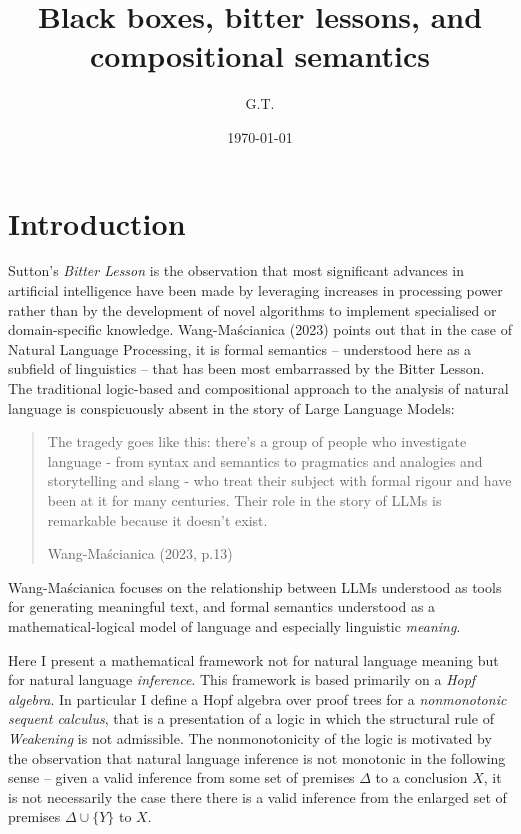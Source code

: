 \documentclass[a4paper,11pt]{report}
\title{Black boxes, bitter lessons, and compositional semantics}
\author{G.T.}
\date{\today}
\begin{document}
\maketitle

\section{Introduction}
Sutton's \emph{Bitter Lesson} is the observation that most significant advances in artificial intelligence have been made by leveraging increases in processing power rather than by the development of novel algorithms to implement specialised or domain-specific knowledge. Wang-Ma\'{s}cianica (2023) points out that in the case of Natural Language Processing, it is formal semantics -- understood here as a subfield of linguistics -- that has been most embarrassed by the Bitter Lesson. The traditional logic-based and compositional approach to the analysis of natural language is conspicuously absent in the story of Large Language Models:

\begin{quote} The tragedy goes like this:
there's a group of people who investigate language - from syntax and semantics to pragmatics and analogies and storytelling and slang - who treat their subject with formal rigour and have been at it for many centuries. Their role in the story of LLMs is remarkable because it doesn't exist. 
\begin{flushright} Wang-Ma\'{s}cianica (2023, p.13)\end{flushright}
\end{quote}

\noindent Wang-Ma\'{s}cianica focuses on the relationship between LLMs understood as tools for generating meaningful text, and formal semantics understood as a mathematical-logical model of language and especially linguistic \emph{meaning}. 

Here I present a mathematical framework not for natural language meaning but for natural language \emph{inference}. This framework is based primarily on a \emph{Hopf algebra}. In particular I define a Hopf algebra over proof trees for a \emph{nonmonotonic sequent calculus}, that is a presentation of a logic in which the structural rule of \emph{Weakening} is not admissible. The nonmonotonicity of the logic is motivated by the observation that natural language inference is not monotonic in the following sense -- given a valid inference from some set of premises $\Delta$ to a conclusion $X$, it is not necessarily the case there there is a valid inference from the enlarged set of premises $\Delta \cup \{Y\}$ to $X$.  
\end{document}
